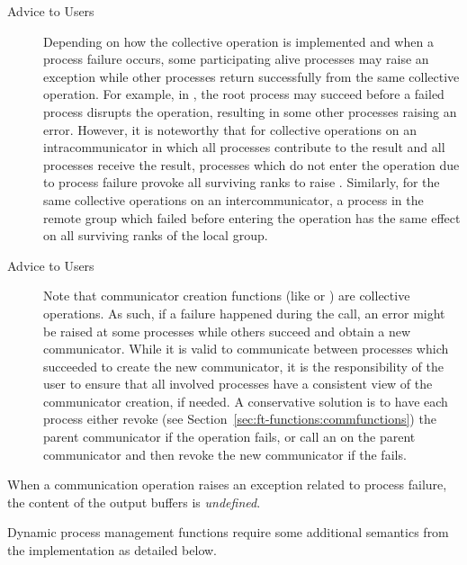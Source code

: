 \begin{description} 

\item[Advice to Users] {Depending on how the collective operation is implemented and when a process
failure occurs, some participating alive processes may raise an exception while
other processes return successfully from the same collective operation. For
example, in , the root process may succeed before a failed
process disrupts the operation, resulting in some other processes raising an
error. 
%
However, it is noteworthy that for collective operations on an intracommunicator
in which all processes contribute to the result and all
processes receive the result, processes which do not enter the
operation due to process failure provoke all surviving ranks to raise
. 
%
Similarly, for the same collective
operations on an intercommunicator, a process in the remote group which failed
before entering the operation has the same effect on all surviving ranks of the
local group.}

\item[Advice to Users] {Note that communicator creation functions (like  or
) are collective operations. As such, if a failure
happened during the call, an error might be raised at some processes while
others succeed and obtain a new communicator.  While it is valid to communicate
between processes which succeeded to create the new communicator, it is the
responsibility of the user to ensure that all involved processes have a
consistent view of the communicator creation, if needed.
%
A conservative solution is to have each process either revoke 
(see Section~\ref{sec:ft-functions:commfunctions}) the parent communicator if the
operation fails, or call an  on the parent communicator
and then revoke the new communicator if the  fails.}

\end{description}

When a communication operation raises an exception related to process failure, the
content of the output buffers is \emph{undefined}.

\label{sec:ft-notification:dyn-process}


Dynamic process management functions require some additional semantics from the
\mpi implementation as detailed below.

